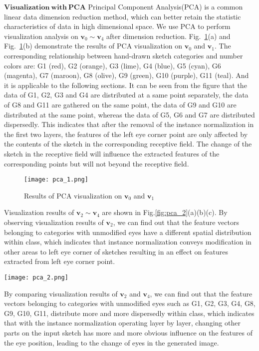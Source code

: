 \documentclass[10pt,twocolumn,letterpaper]{article}
\begin{document}
\noindent
$\mathbf{Visualization ~with ~PCA}$ Principal Component Analysis(PCA)\cite{pca} is a common linear data dimension reduction method, which can better retain the statistic characteristics of data in high dimensional space. 
We use PCA to perform visualization analysis on $\boldsymbol{v}_0\sim \boldsymbol{v}_4$ after dimension reduction.
Fig.~\ref{fig:pca_1}(a) and Fig.~\ref{fig:pca_1}(b) demonstrate the results of PCA visualization on $\boldsymbol{v}_0$ and $\boldsymbol{v}_1$. 
The corresponding relationship between hand-drawn sketch categories and number colors are: G1 (red), G2 (orange), G3 (lime), G4 (blue), G5 (cyan), G6 (magenta), G7 (maroon), G8 (olive), G9 (green), G10 (purple), G11 (teal). And it is applicable to the following sections.
It can be seen from the figure that the data of G1, G2, G3 and G4 are distributed at a same point separately, the data of G8 and G11 are gathered on the same point, the data of G9 and G10 are distributed at the same point, whereas the data of G5, G6 and G7 are distributed dispersedly. 
This indicates that after the removal of the instance normalization in the first two layers, the features of the left eye corner point are only affected by the contents of the sketch in the corresponding receptive field. The change of the sketch in the receptive field will influence the extracted features of the corresponding points but will not beyond the receptive field.
\begin{figure}[htb]
	\centering
	\texttt{[image: pca\_1.png]}
	\caption{Results of PCA visualization on $\boldsymbol{v}_0$ and $\boldsymbol{v}_1$}
	\label{fig:pca_1}
\end{figure}

Visualization results of $\boldsymbol{v}_2 \sim \boldsymbol{v}_4$ are shown in Fig.\ref{fig:pca_2}(a)(b)(c). 
By observing visualization results of $\boldsymbol{v}_2$, we can find out that the feature vectors belonging to categories with unmodified eyes have a different spatial distribution within class, which indicates that instance normalization conveys modification in other areas to left eye corner of sketches resulting in an effect on features extracted from left eye corner point. 
\begin{figure*}[htb]
	\centering
	\texttt{[image: pca\_2.png]}
	\caption{PCA visualization results of $\boldsymbol{v}_2 \sim \boldsymbol{v}_4$}
	\label{fig:pca_2}
\end{figure*}
By comparing visualization results of $\boldsymbol{v}_2$ and $\boldsymbol{v}_4$, we can find out that the feature vectors belonging to categories with unmodified eyes such as G1, G2, G3, G4, G8, G9, G10, G11, distribute more and more dispersedly within class, which indicates that with the instance normalization operating layer by layer, changing other parts on the input sketch has more and more obvious influence on the features of the eye position, leading to the change of eyes in the generated image.
\end{document}
